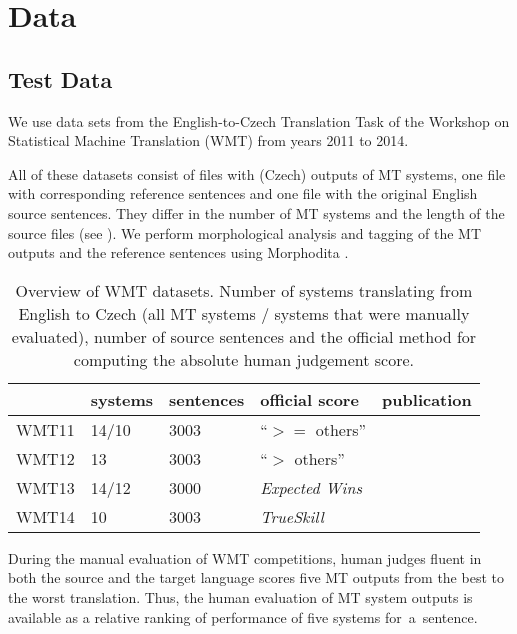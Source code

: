 \chapter{Data}

\section{Test Data}

We use data sets from the English-to-Czech Translation Task of the Workshop on
Statistical Machine Translation (WMT) from years 2011 to 2014.

All of these datasets consist of files with (Czech) outputs of MT systems, one
file with corresponding reference sentences and one file with the original
English source sentences. They differ in the number of MT systems and the 
length of the source files (see ). We perform morphological 
analysis and tagging of the MT outputs and the reference sentences using 
Morphodita \citep{morphodita}. 

\begin{table}[h]
\centering
\begin{tabular}{l|l|l|l|l}
      & systems & sentences & official score & publication\\
\hline
WMT11 & 14/10    & 3003      & “$ >= $ others”      & \cite{wmt11}  \\
WMT12 & 13          & 3003      & “$ > $ others”      & \cite{wmt12}  \\
WMT13 & 14/12    & 3000      & \textit{Expected Wins} & \cite{wmt13}  \\
WMT14 & 10          & 3003      & \textit{TrueSkill}   & \cite{wmt14}
\end{tabular}
\caption{Overview of WMT datasets. Number of systems translating from English 
to Czech (all MT systems / systems that were manually evaluated), number of 
source sentences and the official method for computing the absolute human 
judgement score.}
\label{wmt-data}
\end{table}

During the manual evaluation of WMT competitions, human judges fluent in both
the source and the target language scores five MT outputs from the best to
the worst translation. Thus, the human evaluation of MT system outputs is
available as a relative ranking of performance of five systems for~a~sentence. 


